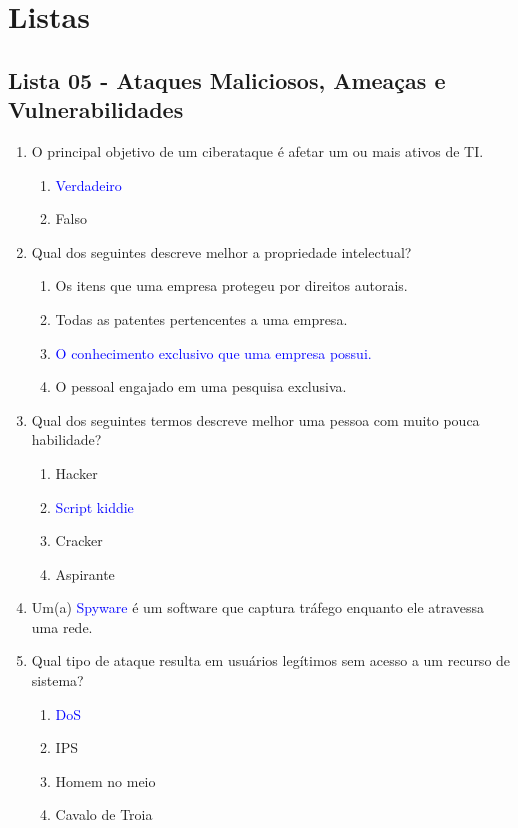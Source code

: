 \documentclass{report}
\begin{document}
	\section{Listas}
	
	\subsection{Lista 05 - Ataques Maliciosos, Ameaças e Vulnerabilidades}
	
	\begin{enumerate}
		\item O principal objetivo de um ciberataque é afetar um ou mais ativos de TI.  
		\begin{enumerate}[label=(\alph*)]
			\item \textcolor{blue}{Verdadeiro}
			\item Falso
		\end{enumerate}
		
		\item Qual dos seguintes descreve melhor a propriedade intelectual?  
		\begin{enumerate}[label=(\alph*)]
			\item Os itens que uma empresa protegeu por direitos autorais.
			\item Todas as patentes pertencentes a uma empresa.
			\item \textcolor{blue}{O conhecimento exclusivo que uma empresa possui.}
			\item O pessoal engajado em uma pesquisa exclusiva.
		\end{enumerate}
		
		\item Qual dos seguintes termos descreve melhor uma pessoa com muito pouca habilidade?  
		\begin{enumerate}[label=(\alph*)]
			\item Hacker
			\item \textcolor{blue}{Script kiddie}
			\item Cracker
			\item Aspirante
		\end{enumerate}
		
		\item Um(a) \textcolor{blue}{Spyware} é um software que captura tráfego enquanto ele atravessa uma rede.
		
		\item Qual tipo de ataque resulta em usuários legítimos sem acesso a um recurso de sistema?  
		\begin{enumerate}[label=(\alph*)]
			\item \textcolor{blue}{DoS}
			\item IPS
			\item Homem no meio
			\item Cavalo de Troia
		\end{enumerate}
		

\end{enumerate}
\end{document}
